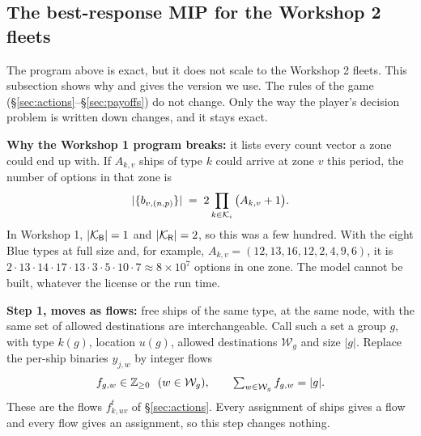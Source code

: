 \begin{addblock}
\subsection{The best-response MIP for the Workshop 2 fleets}\label{sec:mipflow}
The program above is exact, but it does not scale to the Workshop 2 fleets. This subsection shows why and gives the
version we use. The rules of the game (\S\ref{sec:actions}--\S\ref{sec:payoffs}) do not change. Only the way the
player's decision problem is written down changes, and it stays exact.

\textbf{Why the Workshop 1 program breaks:} it lists every count vector a zone could end up with. If $A_{k,v}$ ships
of type $k$ could arrive at zone $v$ this period, the number of options in that zone is
\[
|\{b_{v,(n,p)}\}| \;=\; 2\prod_{k\in\mathcal{K}_i}\big(A_{k,v}+1\big).
\]
In Workshop 1, $|\mathcal{K}_{\mathsf{B}}|=1$ and $|\mathcal{K}_{\mathsf{R}}|=2$, so this was a few hundred. With the eight Blue types at full size and, for example,
$A_{k,v}=(12,13,16,12,2,4,9,6)$, it is
$2\cdot13\cdot14\cdot17\cdot13\cdot3\cdot5\cdot10\cdot7\approx8\times10^{7}$
options in one zone. The model cannot be built, whatever the license or the run time.

\textbf{Step 1, moves as flows:} free ships of the same type, at the same node, with the same set of allowed
destinations are interchangeable. Call such a set a group $g$, with type $k(g)$, location $u(g)$, allowed
destinations $\mathcal W_g$ and size $|g|$. Replace the per-ship binaries $y_{j,w}$ by integer flows
\[
f_{g,w}\in\Z_{\ge0}\ \ (w\in\mathcal W_g),\qquad \textstyle\sum_{w\in\mathcal W_g}f_{g,w}=|g| .
\]
These are the flows $f^t_{k,uv}$ of \S\ref{sec:actions}. Every assignment of ships gives a flow and every flow gives an
assignment, so this step changes nothing.


\end{addblock}
